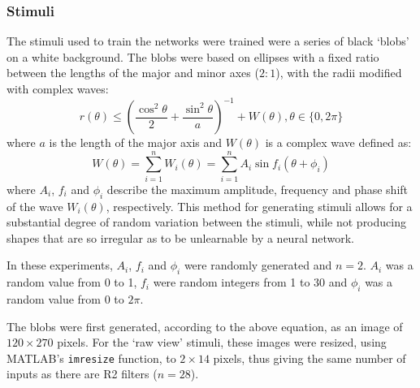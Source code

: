 \documentclass[10pt]{article}
\newcommand{\Matlab}{MATLAB}
\begin{document}
\subsubsection*{Stimuli}
\label{sec:methods:stimuli}
The stimuli used to train the networks were trained were a series of black `blobs' on a white background.
The blobs were based on ellipses with a fixed ratio between the lengths of the major and minor axes ($2:1$), with the radii modified with complex waves:
$$
r(\theta) \le \left(\frac{\cos^2 \theta}{2} + \frac{\sin^2 \theta}{a} \right)^{-1} + W(\theta), \theta \in \{0, 2\pi\}
$$
where $a$ is the length of the major axis and $W(\theta)$ is a complex wave defined as:
$$
W(\theta) = \sum_{i=1}^n W_i(\theta) = \sum_{i=1}^n A_i \sin f_i (\theta+\phi_i) 
$$
where $A_i$, $f_i$ and $\phi_i$ describe the maximum amplitude, frequency and phase shift of the wave $W_i(\theta)$, respectively.
This method for generating stimuli allows for a substantial degree of random variation between the stimuli, while not producing shapes that are so irregular as to be unlearnable by a neural network.

In these experiments, $A_i$, $f_i$ and $\phi_i$ were randomly generated and $n=2$.
$A_i$ was a random value from 0 to 1, $f_i$ were random integers from 1 to 30 and $\phi_i$ was a random value from 0 to $2\pi$.
\begin{comment}
nvar = 1000;
nwave = 2;
maxfreq = 30;
maxamp = 1;
\end{comment}

The blobs were first generated, according to the above equation, as an image of $120\times 270$ pixels.
For the `raw view' stimuli, these images were resized, using \Matlab's \texttt{imresize} function, to $2\times 14$ pixels, thus giving the same number of inputs as there are R2 filters ($n=28$).

\begin{comment}
\subsubsection*{Grading performance of neural networks}
The performance of neural networks was graded by calculating the \ac{rms} difference between the matrix of true values for the parameters with the network's output:
$$
E(\mathbf{y},\mathbf{t}) = \sqrt{\frac{\sum\limits_{i=1}^{n} (\mathbf{y}_i-\mathbf{t}_i)^2}{n}}
$$
where $E(\mathbf{y},\mathbf{t})$ is the mean error score, computed from the vector of outputs given by the network, $\mathbf{y}$, and the vector of true values, $\mathbf{t}$.
Hence, for a network that computed the values of all parameters accurately, a graph of the network's output \emph{vs.} the true values would give the line $y=x$ and an error score of 0 over the whole range of values.
\end{comment}
\end{document}
